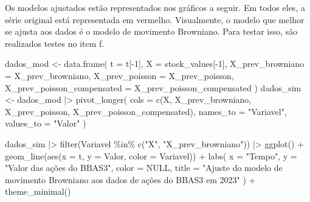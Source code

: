 \documentclass[
  letterpaper,
  DIV=11,
  numbers=noendperiod]{scrreprt}
\newenvironment{Shaded}{\begin{snugshade}}{\end{snugshade}}
\newcommand{\AttributeTok}[1]{\textcolor[rgb]{0.40,0.45,0.13}{#1}}
\newcommand{\ConstantTok}[1]{\textcolor[rgb]{0.56,0.35,0.01}{#1}}
\newcommand{\DecValTok}[1]{\textcolor[rgb]{0.68,0.00,0.00}{#1}}
\newcommand{\FunctionTok}[1]{\textcolor[rgb]{0.28,0.35,0.67}{#1}}
\newcommand{\NormalTok}[1]{\textcolor[rgb]{0.00,0.23,0.31}{#1}}
\newcommand{\OtherTok}[1]{\textcolor[rgb]{0.00,0.23,0.31}{#1}}
\newcommand{\SpecialCharTok}[1]{\textcolor[rgb]{0.37,0.37,0.37}{#1}}
\newcommand{\StringTok}[1]{\textcolor[rgb]{0.13,0.47,0.30}{#1}}
\begin{document}

Os modelos ajustados estão representados nos gráficos a seguir. Em todos
eles, a série original está representada em vermelho. Visualmente, o
modelo que melhor se ajusta aos dados é o modelo de movimento Browniano.
Para testar isso, são realizados testes no item f.

\begin{Shaded}
\begin{Highlighting}[]
\NormalTok{dados\_mod }\OtherTok{\textless{}{-}} \FunctionTok{data.frame}\NormalTok{(}
    \AttributeTok{t =}\NormalTok{ t[}\SpecialCharTok{{-}}\DecValTok{1}\NormalTok{],}
    \AttributeTok{X =}\NormalTok{ stock\_values[}\SpecialCharTok{{-}}\DecValTok{1}\NormalTok{],}
    \AttributeTok{X\_prev\_browniano =}\NormalTok{ X\_prev\_browniano,}
    \AttributeTok{X\_prev\_poisson =}\NormalTok{ X\_prev\_poisson,}
    \AttributeTok{X\_prev\_poisson\_compensated =}\NormalTok{ X\_prev\_poisson\_compensated}
\NormalTok{)}
\NormalTok{dados\_sim }\OtherTok{\textless{}{-}}\NormalTok{ dados\_mod }\SpecialCharTok{|\textgreater{}}
    \FunctionTok{pivot\_longer}\NormalTok{(}
        \AttributeTok{cols =} \FunctionTok{c}\NormalTok{(X,}
\NormalTok{                 X\_prev\_browniano,}
\NormalTok{                 X\_prev\_poisson,}
\NormalTok{                 X\_prev\_poisson\_compensated),}
        \AttributeTok{names\_to =} \StringTok{"Variavel"}\NormalTok{,}
        \AttributeTok{values\_to =} \StringTok{"Valor"}
\NormalTok{    )}
\end{Highlighting}
\end{Shaded}

\begin{Shaded}
\begin{Highlighting}[]
\NormalTok{dados\_sim }\SpecialCharTok{|\textgreater{}}
    \FunctionTok{filter}\NormalTok{(Variavel }\SpecialCharTok{\%in\%} \FunctionTok{c}\NormalTok{(}\StringTok{"X"}\NormalTok{, }\StringTok{"X\_prev\_browniano"}\NormalTok{)) }\SpecialCharTok{|\textgreater{}}
    \FunctionTok{ggplot}\NormalTok{() }\SpecialCharTok{+}
    \FunctionTok{geom\_line}\NormalTok{(}\FunctionTok{aes}\NormalTok{(}\AttributeTok{x =}\NormalTok{ t, }\AttributeTok{y =}\NormalTok{ Valor, }\AttributeTok{color =}\NormalTok{ Variavel)) }\SpecialCharTok{+}
    \FunctionTok{labs}\NormalTok{(}
        \AttributeTok{x =} \StringTok{"Tempo"}\NormalTok{,}
        \AttributeTok{y =} \StringTok{"Valor das ações do BBAS3"}\NormalTok{,}
        \AttributeTok{color =} \ConstantTok{NULL}\NormalTok{,}
        \AttributeTok{title =} \StringTok{"Ajuste do modelo de movimento Browniano}
\StringTok{          aos dados de ações do BBAS3 em 2023"}
\NormalTok{    ) }\SpecialCharTok{+}
    \FunctionTok{theme\_minimal}\NormalTok{()}
\end{Highlighting}
\end{Shaded}
\end{document}

